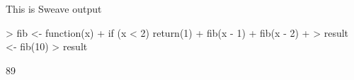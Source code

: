 \documentclass{article}
\begin{document}


This is Sweave output

\begin{Schunk}
\begin{Sinput}
> fib <- function(x) {
+   if (x < 2) return(1)
+   fib(x - 1) + fib(x - 2)
+ }
> result <- fib(10)
> result
\end{Sinput}
\begin{Soutput}
[1] 89
\end{Soutput}
\end{Schunk}
\end{document}
